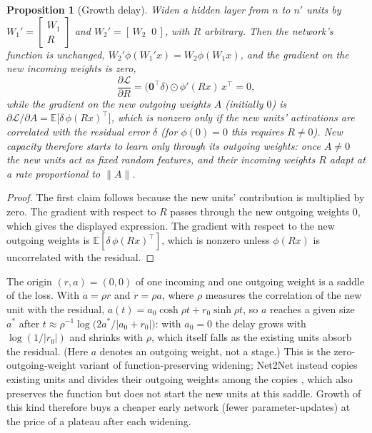 \documentclass{article}
\theoremstyle{plain}
\newtheorem{proposition}{Proposition}
\theoremstyle{remark}
\begin{document}
\begin{proposition}[Growth delay]\label{prop:growth}
Widen a hidden layer from \(n\) to \(n'\) units by \(W_1'=\begin{bmatrix}W_1\\R\end{bmatrix}\) and \(W_2'=[\,W_2\;\;0\,]\), with \(R\) arbitrary. Then the network's function is unchanged, \(W_2'\phi(W_1'x)=W_2\phi(W_1x)\), and the gradient on the new incoming weights is zero,
\begin{equation}\frac{\partial\mathcal L}{\partial R}=\big(\mathbf 0^\top\delta\big)\odot\phi'(Rx)\,x^\top=0,\end{equation}
while the gradient on the new outgoing weights \(A\) (initially \(0\)) is \(\partial\mathcal L/\partial A=\mathbb E\big[\delta\,\phi(Rx)^\top\big]\), which is nonzero only if the new units' activations are correlated with the residual error \(\delta\) (for \(\phi(0)=0\) this requires \(R\neq0\)). New capacity therefore starts to learn only through its outgoing weights: once \(A\neq0\) the new units act as fixed random features, and their incoming weights \(R\) adapt at a rate proportional to \(\lVert A\rVert\).
\end{proposition}

\begin{proof}
The first claim follows because the new units' contribution is multiplied by zero. The gradient with respect to \(R\) passes through the new outgoing weights \(0\), which gives the displayed expression. The gradient with respect to the new outgoing weights is \(\mathbb E[\delta\,\phi(Rx)^\top]\), which is nonzero unless \(\phi(Rx)\) is uncorrelated with the residual.
\end{proof}

The origin \((r,a)=(0,0)\) of one incoming and one outgoing weight is a saddle of the loss. With \(\dot a=\rho r\) and \(\dot r=\rho a\), where \(\rho\) measures the correlation of the new unit with the residual, \(a(t)=a_0\cosh\rho t+r_0\sinh\rho t\), so \(a\) reaches a given size \(a^\ast\) after \(t\approx\rho^{-1}\log\big(2a^\ast/\lvert a_0+r_0\rvert\big)\): with \(a_0=0\) the delay grows with \(\log(1/\lvert r_0\rvert)\) and shrinks with \(\rho\), which itself falls as the existing units absorb the residual. (Here \(a\) denotes an outgoing weight, not a stage.) This is the zero-outgoing-weight variant of function-preserving widening; Net2Net instead copies existing units and divides their outgoing weights among the copies \autocite{chen2016net2net}, which also preserves the function but does not start the new units at this saddle. Growth of this kind therefore buys a cheaper early network (fewer parameter-updates) at the price of a plateau after each widening.
\end{document}
